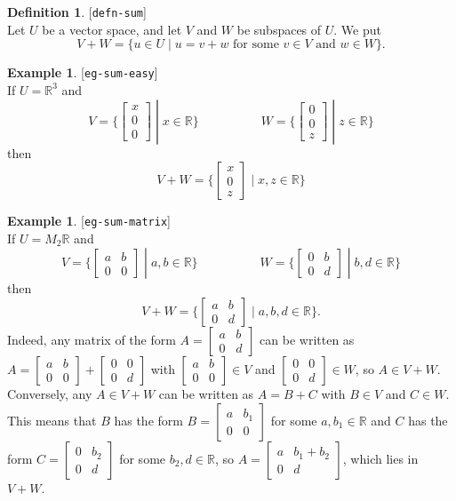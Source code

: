 \documentclass{amsart}
\newcommand{\lbl}[1]{\label{#1}\textup{[\texttt{#1}]}\ \\}
\newcommand{\lbl}{\label}
\newcommand{\R}         {{\mathbb{R}}}
\newcommand{\bsm}       {\left[\begin{smallmatrix}}
\newcommand{\esm}       {\end{smallmatrix}\right]}
\newcommand{\st}        {\;|\;}
\renewcommand{\:}       {\colon}
\theoremstyle{definition}
\newtheorem{definition}[theorem]{Definition}
\newtheorem{example}[theorem]{Example}
\begin{document}
\begin{definition}\lbl{defn-sum}
 Let $U$ be a vector space, and let $V$ and $W$ be subspaces of $U$.
 We put 
 \[ V+W = \{ u \in U \st u = v+w
            \text{ for some } v\in V \text{ and } w\in W \}.
 \]
\end{definition}

\begin{example}\lbl{eg-sum-easy}
 If $U=\R^3$ and
 \[ V = \{\bsm x\\ 0\\ 0\esm\st x\in\R\} \hspace{5em}
    W = \{\bsm 0\\ 0\\ z\esm\st z\in\R\}
 \]
 then
 \[ V+W = \{\bsm x\\ 0\\ z\esm\st x,z\in\R\} \]
\end{example}
\begin{example}\lbl{eg-sum-matrix}
 If $U=M_2\R$ and
 \[ V = \{\bsm a & b \\ 0 & 0\esm\st a,b\in\R\} \hspace{5em}
    W = \{\bsm 0 & b \\ 0 & d\esm\st b,d\in\R\}
 \]
 then
 \[ V+W = \{\bsm a & b \\ 0 & d \esm\st a,b,d\in\R\}. \]
 Indeed, any matrix of the form $A=\bsm a&b\\ 0&d\esm$ can be written
 as $A=\bsm a&b\\0&0\esm+\bsm 0&0\\0&d\esm$ with
 $\bsm a&b\\0&0\esm\in V$ and $\bsm 0&0\\0&d\esm\in W$, so
 $A\in V+W$.  Conversely, any $A\in V+W$ can be written as $A=B+C$
 with $B\in V$ and $C\in W$.  This means that $B$ has the form $B=\bsm
 a&b_1\\0&0\esm$ for some $a,b_1\in\R$ and $C$ has the form
 $C=\bsm 0&b_2\\0&d\esm$ for some $b_2,d\in\R$, so
 $A=\bsm a&b_1+b_2\\ 0&d\esm$, which lies in $V+W$.
\end{example}
\end{document}
